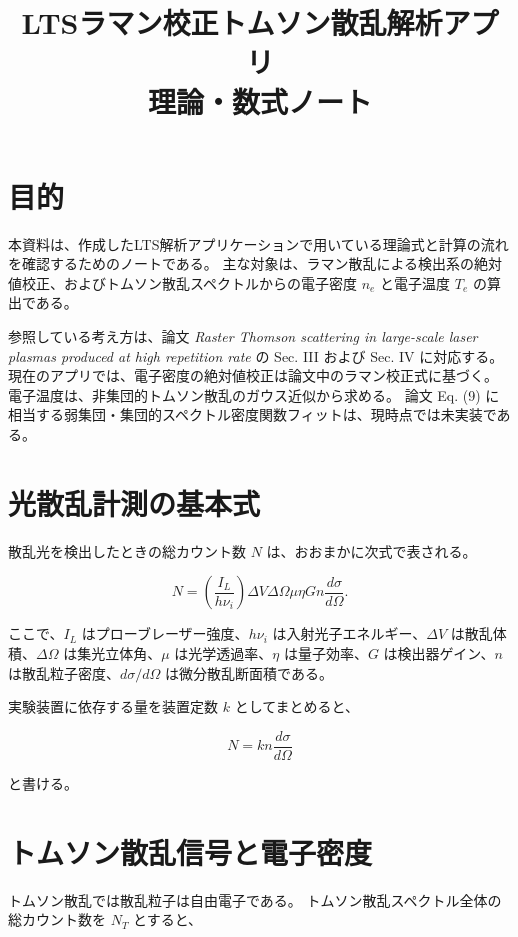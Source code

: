 \documentclass[uplatex,dvipdfmx,11pt]{jsarticle}
\title{LTSラマン校正トムソン散乱解析アプリ\\理論・数式ノート}
\author{}
\date{}
\begin{document}
\maketitle

\section{目的}

本資料は、作成したLTS解析アプリケーションで用いている理論式と計算の流れを確認するためのノートである。
主な対象は、ラマン散乱による検出系の絶対値校正、およびトムソン散乱スペクトルからの電子密度 $n_e$ と電子温度 $T_e$ の算出である。

参照している考え方は、論文 \textit{Raster Thomson scattering in large-scale laser plasmas produced at high repetition rate} の Sec. III および Sec. IV に対応する。
現在のアプリでは、電子密度の絶対値校正は論文中のラマン校正式に基づく。
電子温度は、非集団的トムソン散乱のガウス近似から求める。
論文 Eq. (9) に相当する弱集団・集団的スペクトル密度関数フィットは、現時点では未実装である。

\section{光散乱計測の基本式}

散乱光を検出したときの総カウント数 $N$ は、おおまかに次式で表される。

\begin{equation}
N
=
\left(\frac{I_L}{h\nu_i}\right)
\Delta V
\Delta\Omega
\mu
\eta
G
n
\frac{d\sigma}{d\Omega}.
\end{equation}

ここで、$I_L$ はプローブレーザー強度、$h\nu_i$ は入射光子エネルギー、$\Delta V$ は散乱体積、$\Delta\Omega$ は集光立体角、$\mu$ は光学透過率、$\eta$ は量子効率、$G$ は検出器ゲイン、$n$ は散乱粒子密度、$d\sigma/d\Omega$ は微分散乱断面積である。

実験装置に依存する量を装置定数 $k$ としてまとめると、

\begin{equation}
N = k n \frac{d\sigma}{d\Omega}
\end{equation}

と書ける。

\section{トムソン散乱信号と電子密度}

トムソン散乱では散乱粒子は自由電子である。
トムソン散乱スペクトル全体の総カウント数を $N_T$ とすると、
\end{document}

